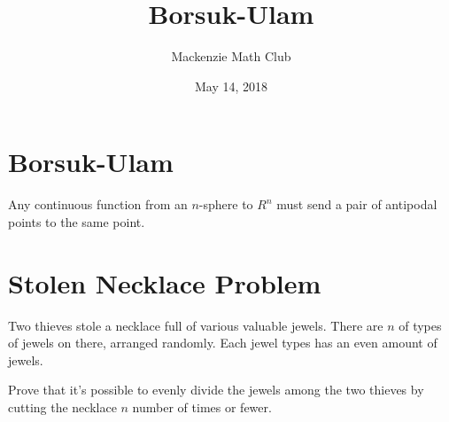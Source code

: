 

\title{Borsuk-Ulam}
\author{Mackenzie Math Club}
\date{May 14, 2018}



	\section*{Borsuk-Ulam}
		Any continuous function from an $n$-sphere to $R^n$ must send a pair of antipodal points to the same point.
	\section*{Stolen Necklace Problem}
		Two thieves stole a necklace full of various valuable jewels.
		There are $n$ of types of jewels on there, arranged randomly.
		Each jewel types has an even amount of jewels.
		
		Prove that it's possible to evenly divide the jewels among the two thieves by cutting the necklace $n$ number of times or fewer.

